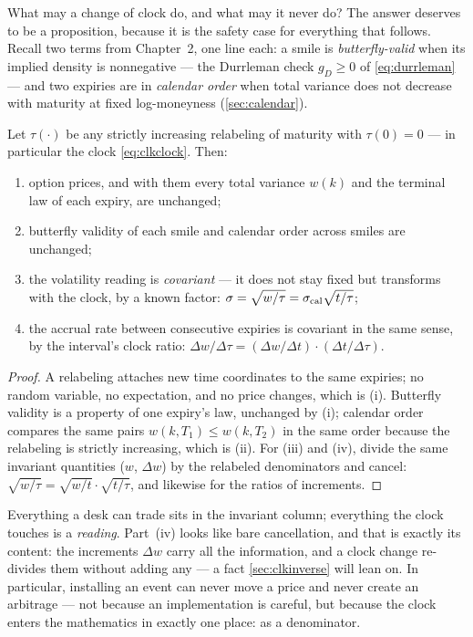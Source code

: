 What may a change of clock do, and what may it never do?  The answer
deserves to be a proposition, because it is the safety case for
everything that follows.  Recall two terms from Chapter~2, one line
each: a smile is \emph{butterfly-valid} when its implied density is
nonnegative --- the Durrleman check $g_D\ge0$ of \eqref{eq:durrleman}
--- and two expiries are in \emph{calendar order} when total variance
does not decrease with maturity at fixed log-moneyness
(\cref{sec:calendar}).

\begin{proposition}
\label{prop:clkgauge}
Let $\tau(\cdot)$ be any strictly increasing relabeling of maturity
with $\tau(0)=0$ --- in particular the clock \eqref{eq:clkclock}.
Then:
\begin{enumerate}[label=(\roman*)]
\item option prices, and with them every total variance $w(k)$ and
the terminal law of each expiry, are unchanged;
\item butterfly validity of each smile and calendar order across
smiles are unchanged;
\item the volatility reading is \emph{covariant} --- it does not stay
fixed but transforms with the clock, by a known factor:
$\sigma=\sqrt{w/\tau}=\sigma_{\rm cal}\sqrt{t/\tau}$;
\item the accrual rate between consecutive expiries is covariant in
the same sense, by the interval's clock ratio:
$\Delta w/\Delta\tau
=(\Delta w/\Delta t)\cdot(\Delta t/\Delta\tau)$.
\end{enumerate}
\end{proposition}

\begin{proof}
A relabeling attaches new time coordinates to the same expiries; no
random variable, no expectation, and no price changes, which is (i).
Butterfly validity is a property of one expiry's law, unchanged by
(i); calendar order compares the same pairs $w(k,T_1)\le w(k,T_2)$ in
the same order because the relabeling is strictly increasing, which
is (ii).  For (iii) and (iv), divide the same invariant quantities
($w$, $\Delta w$) by the relabeled denominators and cancel:
$\sqrt{w/\tau}=\sqrt{w/t}\cdot\sqrt{t/\tau}$, and likewise for the
ratios of increments.
\end{proof}

Everything a desk can trade sits in the invariant column; everything
the clock touches is a \emph{reading}.  Part~(iv) looks like bare
cancellation, and that is exactly its content: the increments
$\Delta w$ carry all the information, and a clock change re-divides
them without adding any --- a fact \cref{sec:clkinverse} will lean
on.  In particular, installing an event can never move a price and
never create an arbitrage --- not because an implementation is
careful, but because the clock enters the mathematics in exactly one
place: as a denominator.

